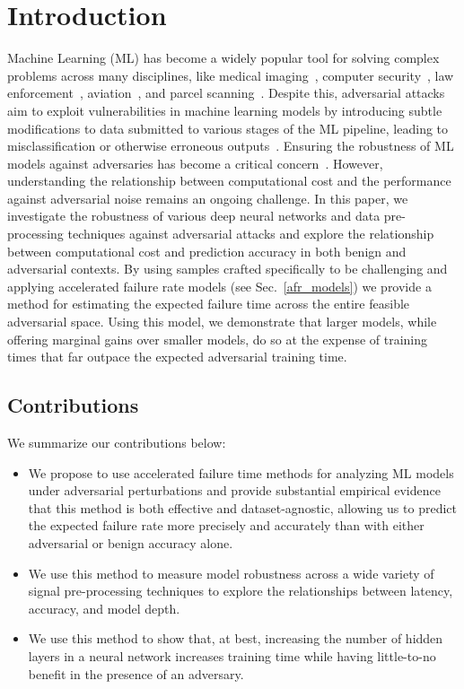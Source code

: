 \section{Introduction}

Machine Learning (ML) has become a widely popular tool for solving complex problems across many disciplines, like medical imaging~\citep{ai_medical_imaging}, computer security~\citep{ai_security}, law enforcement~\citep{ai_prison}, aviation~\citep{ai_aviation}, and parcel scanning~\cite{ai_luggage}. Despite this, adversarial attacks aim to exploit vulnerabilities in machine learning models by introducing subtle modifications to data submitted to various stages of the ML pipeline, leading to misclassification or otherwise erroneous outputs~\citep{chakraborty_adversarial_2018}. Ensuring the robustness of ML models against adversaries has become a critical concern~\citep{adversarialpatch,carlini_towards_2017,croce_reliable_2020,hopskipjump,art2018,meyers}. However, understanding the relationship between computational cost and the performance against adversarial noise remains an ongoing challenge.  In this paper, we  investigate the robustness of various deep neural networks and data pre-processing techniques against adversarial attacks and explore the relationship between computational cost and  prediction accuracy in both benign and adversarial contexts.  By using samples crafted specifically to be challenging and applying accelerated failure rate models (see Sec.~\ref{afr_models}) we provide a method for estimating the expected failure time across the entire feasible adversarial space. Using this model, we demonstrate that larger models, while offering marginal gains over smaller models, do so at the expense of training times that far outpace the expected adversarial training time.

\subsection{Contributions}

We summarize our contributions below:
\begin{itemize}
    \item We propose to use accelerated failure time methods for analyzing ML models under adversarial perturbations and provide substantial empirical evidence that this method is both effective and dataset-agnostic, allowing us to predict the expected failure rate more precisely and accurately than with either adversarial or benign accuracy alone.
    \item We use this method to measure model robustness across a wide variety of signal pre-processing techniques to explore the relationships between latency, accuracy, and model depth.
    \item We use this method to show that, at best, increasing the number of hidden layers in a neural network increases training time while having little-to-no benefit in the presence of an adversary.
\end{itemize}
